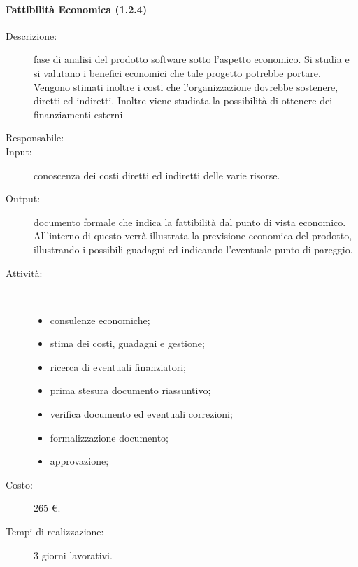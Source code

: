 \paragraph{Fattibilità Economica (1.2.4)}
\begin{description}
\item[Descrizione:] fase di analisi del prodotto software sotto l'aspetto economico. Si studia e si valutano i benefici economici che tale progetto potrebbe portare. Vengono stimati inoltre i costi che l'organizzazione dovrebbe sostenere, diretti ed indiretti. Inoltre viene studiata la possibilità di ottenere dei finanziamenti esterni 
\item[Responsabile:] 
\item[Input:] conoscenza dei costi diretti ed indiretti delle varie risorse.
\item[Output:] documento formale che indica la fattibilità dal punto di vista economico. All'interno di questo verrà illustrata la previsione economica del prodotto, illustrando i possibili guadagni ed indicando l'eventuale punto di pareggio.
\item[Attività:]\mbox{}\\[-1.5\baselineskip]
	\begin{itemize}
	\item consulenze economiche;
	\item stima dei costi, guadagni e gestione;
	\item ricerca di eventuali finanziatori;
	\item prima stesura documento riassuntivo;
	\item verifica documento ed eventuali correzioni;
	\item formalizzazione documento;
	\item approvazione;
	\end{itemize}
\item[Costo:] 265 \euro.
\item[Tempi di realizzazione:] 3 giorni lavorativi.
\end{description}

